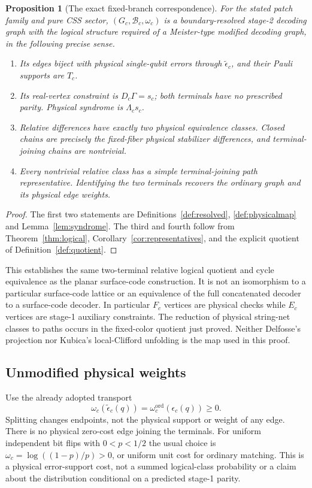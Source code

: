 \documentclass[11pt]{article}
\theoremstyle{definition}
\theoremstyle{plain}
\newtheorem{proposition}[definition]{Proposition}
\theoremstyle{remark}
\newcommand{\eps}{\epsilon}
\begin{document}
\begin{proposition}[The exact fixed-branch correspondence]\label{prop:meister}
For the stated patch family and pure CSS sector,
$(G_c,\mathcal B_c,\omega_c)$ is a boundary-resolved stage-2 decoding
graph with the logical structure required of a Meister-type modified
decoding graph, in the following precise sense.
\begin{enumerate}
 \item Its edges biject with physical single-qubit errors through
 $\widetilde\eps_c$, and their Pauli supports are $T_c$.
 \item Its real-vertex constraint is $D_c\Gamma=s_c$; both terminals
 have no prescribed parity. Physical syndrome is $\Lambda_cs_c$.
 \item Relative differences have exactly two physical equivalence
 classes. Closed chains are precisely the fixed-fiber physical
 stabilizer differences, and terminal-joining chains are nontrivial.
 \item Every nontrivial relative class has a simple terminal-joining
 path representative. Identifying the two terminals recovers the
 ordinary graph and its physical edge weights.
\end{enumerate}
\end{proposition}
\begin{proof}
The first two statements are Definitions~\ref{def:resolved},
\ref{def:physicalmap} and Lemma~\ref{lem:syndrome}.
The third and fourth follow from Theorem~\ref{thm:logical},
Corollary~\ref{cor:representatives}, and the explicit quotient
of Definition~\ref{def:quotient}.
\end{proof}

This establishes the same two-terminal relative logical quotient and
cycle equivalence as the planar surface-code construction.
It is not an isomorphism to a particular surface-code lattice or an
equivalence of the full concatenated decoder to a surface-code decoder.
In particular $F_c$ vertices are physical checks while $E_c$ vertices
are stage-1 auxiliary constraints. The reduction of physical string-net
classes to paths occurs in the fixed-color quotient just proved.
Neither Delfosse's projection \cite[Definition~5.5, Theorem~5.6]{Delfosse}
nor Kubica's local-Clifford unfolding
\cite[Sec.~III.B, Theorem~3]{Kubica} is the map used in this proof.

\subsection{Unmodified physical weights}
Use the already adopted transport
\[
 \omega_c(\widetilde\eps_c(q))
       =\omega_c^{\mathrm{ord}}(\eps_c(q))\geq0 .
\]
Splitting changes endpoints, not the physical support or weight of any
edge. There is no physical zero-cost edge joining the terminals.
For uniform independent bit flips with $0<p<1/2$ the usual choice is
$\omega_c=\log((1-p)/p)>0$, or uniform unit cost for ordinary matching.
This is a physical error-support cost, not a summed logical-class
probability or a claim about the distribution conditional on a
predicted stage-1 parity.
\end{document}
